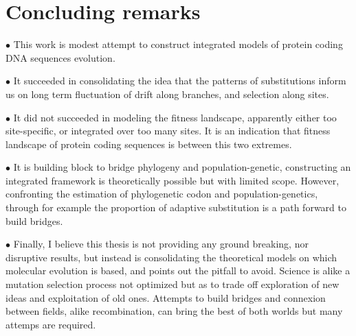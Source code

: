 \section{Concluding remarks}
\label{sec:concluding-remarks}

$\bullet$ This work is modest attempt to construct integrated models of protein coding DNA sequences evolution.

$\bullet$ It succeeded in consolidating the idea that the patterns of substitutions inform us on long term fluctuation of drift along branches, and selection along sites.

$\bullet$ It did not succeeded in modeling the fitness landscape, apparently either too site-specific, or integrated over too many sites.
It is an indication that fitness landscape of protein coding sequences is between this two extremes.

$\bullet$ It is building block to bridge phylogeny and population-genetic, constructing an integrated framework is theoretically possible but with limited scope.
However, confronting the estimation of phylogenetic codon and population-genetics, through for example the proportion of adaptive substitution is a path forward to build bridges.

$\bullet$ Finally, I believe this thesis is not providing any ground breaking, nor disruptive results, but instead is consolidating the theoretical models on which molecular evolution is based, and points out the pitfall to avoid.
Science is alike a mutation selection process not optimized but as to trade off exploration of new ideas and exploitation of old ones.
Attempts to build bridges and connexion between fields, alike recombination, can bring the best of both worlds but many attemps are required.